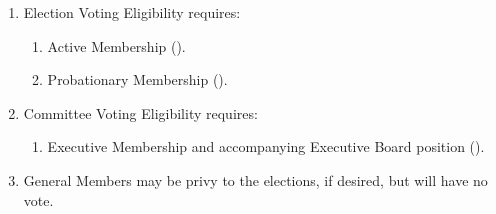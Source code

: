 
\begin{enumerate}
	\item Election Voting Eligibility requires:
		\begin{enumerate}
			\item Active Membership ().

			\item Probationary Membership ().
		\end{enumerate}

	\item Committee Voting Eligibility requires:
		\begin{enumerate}
			\item Executive Membership and accompanying Executive Board position ().
		\end{enumerate}

	\item General Members may be privy to the elections, if desired, but will have
		no vote.
\end{enumerate}

